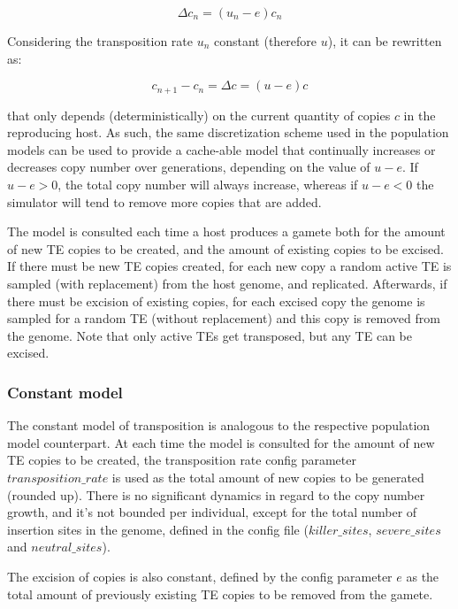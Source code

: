\documentclass[10pt]{article}
\begin{document}
\begin{equation}
  \Delta c_n = (u_n - e) c_n
\end{equation}

Considering the transposition rate $u_n$ constant (therefore $u$), it
can be rewritten as:

\begin{equation}
 c_{n+1} - c_n = \Delta c = (u - e) c
\end{equation}

that only depends (deterministically) on the current quantity of
copies $c$ in the reproducing host. As such, the same discretization
scheme used in the population models can be used to provide a
cache-able model that continually increases or decreases copy number
over generations, depending on the value of $u-e$. If $u-e >0$, the
total copy number will always increase, whereas if $u-e<0$ the
simulator will tend to remove more copies that are added.

The model is consulted each time a host produces a gamete both for the
amount of new TE copies to be created, and the amount of existing
copies to be excised. If there must be new TE copies created, for each
new copy a random active TE is sampled (with replacement) from the
host genome, and replicated. Afterwards, if there must be excision of
existing copies, for each excised copy the genome is sampled for a
random TE (without replacement) and this copy is removed from the
genome. Note that only active TEs get transposed, but any TE can be
excised.

\subsubsection{Constant model}

The constant model of transposition is analogous to the respective
population model counterpart. At each time the model is consulted for
the amount of new TE copies to be created, the transposition rate
config parameter $transposition\_rate$ is used as the total amount of
new copies to be generated (rounded up). There is no significant
dynamics in regard to the copy number growth, and it's not bounded per
individual, except for the total number of insertion sites in the
genome, defined in the config file ($killer\_sites$, $severe\_sites$
and $neutral\_sites$). 

The excision of copies is also constant, defined by the config
parameter $e$ as the total amount of previously existing TE copies to
be removed from the gamete.
\end{document}
